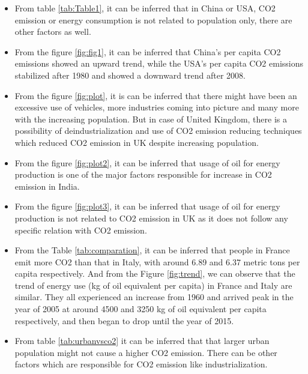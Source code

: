 \documentclass[11pt,a4paper,]{article}
\begin{document}
\begin{itemize}
\item
  From table \ref{tab:Table1}, it can be inferred that in China or USA, CO2 emission or energy consumption is not related to population only, there are other factors as well.
\item
  From the figure \ref{fig:fig1}, it can be inferred that China's per capita CO2 emissions showed an upward trend, while the USA's per capita CO2 emissions stabilized after 1980 and showed a downward trend after 2008.
\item
  From the figure \ref{fig:plot}, it is can be inferred that there might have been an excessive use of vehicles, more industries coming into picture and many more with the increasing population. But in case of United Kingdom, there is a possibility of deindustrialization and use of CO2 emission reducing techniques which reduced CO2 emission in UK despite increasing population.
\item
  From the figure \ref{fig:plot2}, it can be inferred that usage of oil for energy production is one of the major factors responsible for increase in CO2 emission in India.
\item
  From the figure \ref{fig:plot3}, it can be inferred that usage of oil for energy production is not related to CO2 emission in UK as it does not follow any specific relation with CO2 emission.
\item
  From the Table \ref{tab:comparation}, it can be inferred that people in France emit more CO2 than that in Italy, with around 6.89 and 6.37 metric tons per capita respectively. And from the Figure \ref{fig:trend}, we can observe that the trend of energy use (kg of oil equivalent per capita) in France and Italy are similar. They all experienced an increase from 1960 and arrived peak in the year of 2005 at around 4500 and 3250 kg of oil equivalent per capita respectively, and then began to drop until the year of 2015.
\item
  From table \ref{tab:urbanvsco2} it can be inferred that that larger urban population might not cause a higher CO2 emission. There can be other factors which are responsible for CO2 emission like industrialization.
\end{itemize}

\clearpage

\printbibliography
\end{document}
